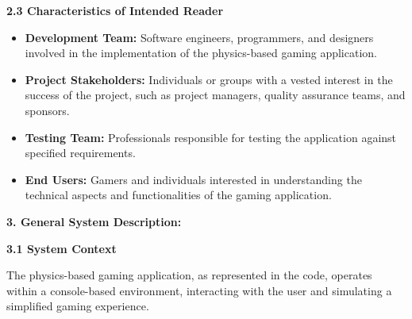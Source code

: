 \documentclass[
]{article}
\begin{document}
\protect\hypertarget{qwwww}{}{}\textbf{2.3 Characteristics of Intended
Reader}

\begin{itemize}
\item
  \textbf{Development Team:} Software engineers, programmers, and
  designers involved in the implementation of the physics-based gaming
  application.
\item
  \textbf{Project Stakeholders:} Individuals or groups with a vested
  interest in the success of the project, such as project managers,
  quality assurance teams, and sponsors.
\item
  \textbf{Testing Team:} Professionals responsible for testing the
  application against specified requirements.
\item
  \textbf{End Users:} Gamers and individuals interested in understanding
  the technical aspects and functionalities of the gaming application.
\end{itemize}

\protect\hypertarget{qe}{}{}\textbf{3. General System Description:}

\protect\hypertarget{qee}{}{}\textbf{3.1 System Context}

The physics-based gaming application, as represented in the code,
operates within a console-based environment, interacting with the user
and simulating a simplified gaming experience.
\end{document}
